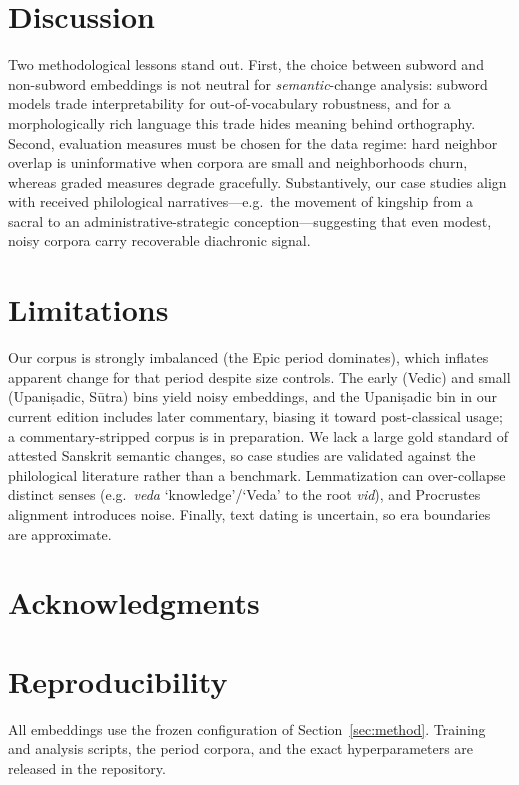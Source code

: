 \documentclass[11pt]{article}
\begin{document}
\section{Discussion}
Two methodological lessons stand out. First, the choice between subword and non-subword embeddings is not neutral for \emph{semantic}-change analysis: subword models trade interpretability for out-of-vocabulary robustness, and for a morphologically rich language this trade hides meaning behind orthography. Second, evaluation measures must be chosen for the data regime: hard neighbor overlap is uninformative when corpora are small and neighborhoods churn, whereas graded measures degrade gracefully. Substantively, our case studies align with received philological narratives---e.g.\ the movement of kingship from a sacral to an administrative-strategic conception---suggesting that even modest, noisy corpora carry recoverable diachronic signal.

\section*{Limitations}
Our corpus is strongly imbalanced (the Epic period dominates), which inflates apparent change for that period despite size controls. The early (Vedic) and small (Upani\d{s}adic, S\=utra) bins yield noisy embeddings, and the Upani\d{s}adic bin in our current edition includes later commentary, biasing it toward post-classical usage; a commentary-stripped corpus is in preparation. %
We lack a large gold standard of attested Sanskrit semantic changes, so case studies are validated against the philological literature rather than a benchmark. Lemmatization can over-collapse distinct senses (e.g.\ \textit{veda} `knowledge'/`Veda' to the root \textit{vid}), and Procrustes alignment introduces noise. Finally, text dating is uncertain, so era boundaries are approximate.

\section*{Acknowledgments}



\appendix
\section{Reproducibility}
\label{sec:appendix}
All embeddings use the frozen configuration of Section~\ref{sec:method}. Training and analysis scripts, the period corpora, and the exact hyperparameters are released in the repository. %
\end{document}
